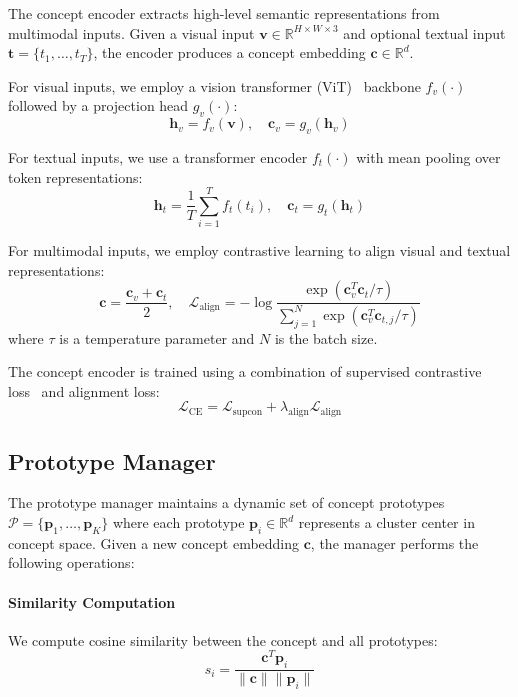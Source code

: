 \documentclass{article}
\begin{document}
The concept encoder extracts high-level semantic representations from multimodal inputs. Given a visual input $\mathbf{v} \in \mathbb{R}^{H \times W \times 3}$ and optional textual input $\mathbf{t} = \{t_1, \ldots, t_T\}$, the encoder produces a concept embedding $\mathbf{c} \in \mathbb{R}^d$.

For visual inputs, we employ a vision transformer (ViT)~\cite{dosovitskiy2020image} backbone $f_v(\cdot)$ followed by a projection head $g_v(\cdot)$:
\begin{equation}
\mathbf{h}_v = f_v(\mathbf{v}), \quad \mathbf{c}_v = g_v(\mathbf{h}_v)
\end{equation}

For textual inputs, we use a transformer encoder $f_t(\cdot)$ with mean pooling over token representations:
\begin{equation}
\mathbf{h}_t = \frac{1}{T} \sum_{i=1}^T f_t(t_i), \quad \mathbf{c}_t = g_t(\mathbf{h}_t)
\end{equation}

For multimodal inputs, we employ contrastive learning to align visual and textual representations:
\begin{equation}
\mathbf{c} = \frac{\mathbf{c}_v + \mathbf{c}_t}{2}, \quad \mathcal{L}_{\text{align}} = -\log \frac{\exp(\mathbf{c}_v^T \mathbf{c}_t / \tau)}{\sum_{j=1}^N \exp(\mathbf{c}_v^T \mathbf{c}_{t,j} / \tau)}
\end{equation}
where $\tau$ is a temperature parameter and $N$ is the batch size.

The concept encoder is trained using a combination of supervised contrastive loss~\cite{khosla2020supervised} and alignment loss:
\begin{equation}
\mathcal{L}_{\text{CE}} = \mathcal{L}_{\text{supcon}} + \lambda_{\text{align}} \mathcal{L}_{\text{align}}
\end{equation}

\subsection{Prototype Manager}
\label{sec:prototype_manager}

The prototype manager maintains a dynamic set of concept prototypes $\mathcal{P} = \{\mathbf{p}_1, \ldots, \mathbf{p}_K\}$ where each prototype $\mathbf{p}_i \in \mathbb{R}^d$ represents a cluster center in concept space. Given a new concept embedding $\mathbf{c}$, the manager performs the following operations:

\paragraph{Similarity Computation} We compute cosine similarity between the concept and all prototypes:
\begin{equation}
s_i = \frac{\mathbf{c}^T \mathbf{p}_i}{\|\mathbf{c}\| \|\mathbf{p}_i\|}
\end{equation}
\end{document}
